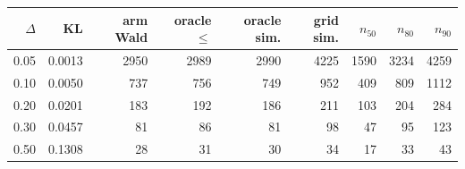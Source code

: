\begin{tabular}{rrrrrrrrr}
\toprule
$\Delta$ & KL & arm Wald & oracle $\le$ & oracle sim. & grid sim. & $n_{50}$ & $n_{80}$ & $n_{90}$ \\
\midrule
0.05 & 0.0013 & 2950 & 2989 & 2990 & 4225 & 1590 & 3234 & 4259 \\
0.10 & 0.0050 & 737 & 756 & 749 & 952 & 409 & 809 & 1112 \\
0.20 & 0.0201 & 183 & 192 & 186 & 211 & 103 & 204 & 284 \\
0.30 & 0.0457 & 81 & 86 & 81 & 98 & 47 & 95 & 123 \\
0.50 & 0.1308 & 28 & 31 & 30 & 34 & 17 & 33 & 43 \\
\bottomrule
\end{tabular}
